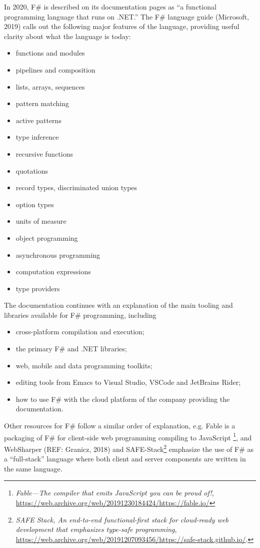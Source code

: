 \documentclass[acmsmall]{acmart}\settopmatter{}
\begin{document}
In 2020, F\# is described on its documentation pages as “a functional programming language that runs on .NET.” The F\# language guide (Microsoft, 2019) calls out the following major features of the language, providing useful clarity about what the language is today:
\begin{itemize}
\item functions and modules
\item pipelines and composition
\item lists, arrays, sequences
\item pattern matching 
\item active patterns 
\item type inference
\item recursive functions
\item quotations
\item record types, discriminated union types
\item option types
\item units of measure
\item object programming
\item asynchronous programming
\item computation expressions
\item type providers
\end{itemize}
The documentation continues with an explanation of the main tooling and libraries available for F\# programming, including
\begin{itemize}
\item cross-platform compilation and execution;
\item the primary F\# and .NET libraries;
\item web, mobile and data programming toolkits;
\item editing tools from Emacs to Visual Studio, VSCode and JetBrains Rider;
\item how to use F\# with the cloud platform of the company providing the documentation.
\end{itemize}
Other resources for F\# follow a similar order of explanation, e.g. Fable  is a packaging of F\# for client-side web
programming compiling to JavaScript \footnote{ \textit{Fable---The compiler that emits JavaScript you can be proud of!}, \url{https://web.archive.org/web/20191230184424/https://fable.io/}}, and
WebSharper (REF: Granicz, 2018) and SAFE-Stack\footnote{\textit{SAFE Stack, An end-to-end functional-first stack for
cloud-ready web development that emphasizes type-safe programming}, \url{https://web.archive.org/web/20191207093456/https://safe-stack.github.io/}.} emphasize
the use of F\# as a “full-stack” language where both client and server components are written in the
same language.
\end{document}
